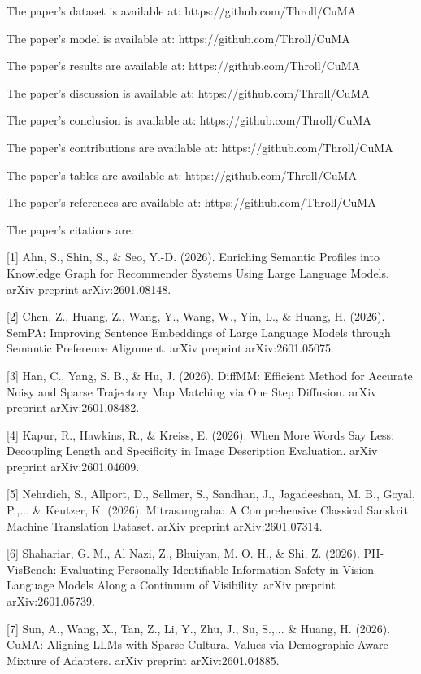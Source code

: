 The paper's dataset is available at: https://github.com/Throll/CuMA

The paper's model is available at: https://github.com/Throll/CuMA

The paper's results are available at: https://github.com/Throll/CuMA

The paper's discussion is available at: https://github.com/Throll/CuMA

The paper's conclusion is available at: https://github.com/Throll/CuMA

The paper's contributions are available at: https://github.com/Throll/CuMA

The paper's tables are available at: https://github.com/Throll/CuMA

The paper's references are available at: https://github.com/Throll/CuMA

The paper's citations are:

[1] Ahn, S., Shin, S., & Seo, Y.-D. (2026). Enriching Semantic Profiles into Knowledge Graph for Recommender Systems Using Large Language Models. arXiv preprint arXiv:2601.08148.

[2] Chen, Z., Huang, Z., Wang, Y., Wang, W., Yin, L., & Huang, H. (2026). SemPA: Improving Sentence Embeddings of Large Language Models through Semantic Preference Alignment. arXiv preprint arXiv:2601.05075.

[3] Han, C., Yang, S. B., & Hu, J. (2026). DiffMM: Efficient Method for Accurate Noisy and Sparse Trajectory Map Matching via One Step Diffusion. arXiv preprint arXiv:2601.08482.

[4] Kapur, R., Hawkins, R., & Kreiss, E. (2026). When More Words Say Less: Decoupling Length and Specificity in Image Description Evaluation. arXiv preprint arXiv:2601.04609.

[5] Nehrdich, S., Allport, D., Sellmer, S., Sandhan, J., Jagadeeshan, M. B., Goyal, P.,... & Keutzer, K. (2026). Mitrasamgraha: A Comprehensive Classical Sanskrit Machine Translation Dataset. arXiv preprint arXiv:2601.07314.

[6] Shahariar, G. M., Al Nazi, Z., Bhuiyan, M. O. H., & Shi, Z. (2026). PII-VisBench: Evaluating Personally Identifiable Information Safety in Vision Language Models Along a Continuum of Visibility. arXiv preprint arXiv:2601.05739.

[7] Sun, A., Wang, X., Tan, Z., Li, Y., Zhu, J., Su, S.,... & Huang, H. (2026). CuMA: Aligning LLMs with Sparse Cultural Values via Demographic-Aware Mixture of Adapters. arXiv preprint arXiv:2601.04885.

